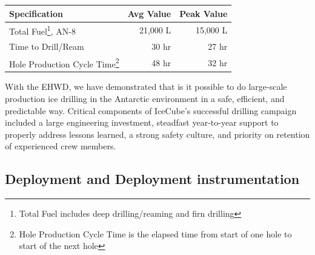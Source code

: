 \begin{minipage}{\textwidth}
  \centering
  \begin{tabular}{ l | r  | r }
    \bf{Specification} & Avg Value  & Peak Value\\
    \hline	
    Total Fuel\footnote{Total Fuel includes deep drilling/reaming and firn drilling}, AN-8 & 21,000 L & 15,000 L \\
    Time to Drill/Ream & 30 hr& 27 hr \\   
    Hole Production Cycle Time\footnote{Hole Production Cycle Time is the elapsed time from start of one hole to start of the next hole} & 48 hr & 32 hr \\
    \end{tabular}
  
  \label{tab:ehwd_system_peak}
\end{minipage}
\vspace{\baselineskip}


With the EHWD, we have demonstrated that is it possible to do large-scale production ice drilling in the Antarctic environment in a safe, efficient, and predictable way.  Critical components of IceCube’s successful drilling campaign included a large engineering investment, steadfast year-to-year support to properly address lessons learned, a strong safety culture, and priority on retention of experienced crew members.

\subsection{\label{sec:deployment_inst}Deployment and Deployment instrumentation}

